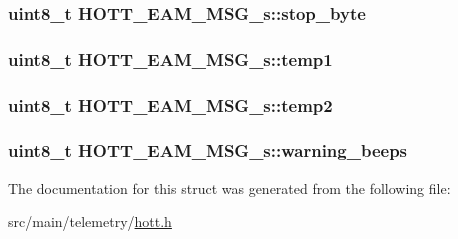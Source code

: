 \hypertarget{structHOTT__EAM__MSG__s_a2bf284ecf0a8381293138397b1b5e9b4}{
\subsubsection[{stop\+\_\+byte}]{\setlength{\rightskip}{0pt plus 5cm}uint8\+\_\+t H\+O\+T\+T\+\_\+\+E\+A\+M\+\_\+\+M\+S\+G\+\_\+s\+::stop\+\_\+byte}}\label{structHOTT__EAM__MSG__s_a2bf284ecf0a8381293138397b1b5e9b4}
\hypertarget{structHOTT__EAM__MSG__s_ab2403b2e6d20294e9b9415f9c4a496a4}{
\subsubsection[{temp1}]{\setlength{\rightskip}{0pt plus 5cm}uint8\+\_\+t H\+O\+T\+T\+\_\+\+E\+A\+M\+\_\+\+M\+S\+G\+\_\+s\+::temp1}}\label{structHOTT__EAM__MSG__s_ab2403b2e6d20294e9b9415f9c4a496a4}
\hypertarget{structHOTT__EAM__MSG__s_a20a4cd589d7ca3e6f43f9589de95f29d}{
\subsubsection[{temp2}]{\setlength{\rightskip}{0pt plus 5cm}uint8\+\_\+t H\+O\+T\+T\+\_\+\+E\+A\+M\+\_\+\+M\+S\+G\+\_\+s\+::temp2}}\label{structHOTT__EAM__MSG__s_a20a4cd589d7ca3e6f43f9589de95f29d}
\hypertarget{structHOTT__EAM__MSG__s_aa6ccdc16a41b8fc95220095b44c218f4}{
\subsubsection[{warning\+\_\+beeps}]{\setlength{\rightskip}{0pt plus 5cm}uint8\+\_\+t H\+O\+T\+T\+\_\+\+E\+A\+M\+\_\+\+M\+S\+G\+\_\+s\+::warning\+\_\+beeps}}\label{structHOTT__EAM__MSG__s_aa6ccdc16a41b8fc95220095b44c218f4}


The documentation for this struct was generated from the following file\+:\begin{DoxyCompactItemize}
\item 
src/main/telemetry/\hyperlink{telemetry_2hott_8h}{hott.\+h}\end{DoxyCompactItemize}
